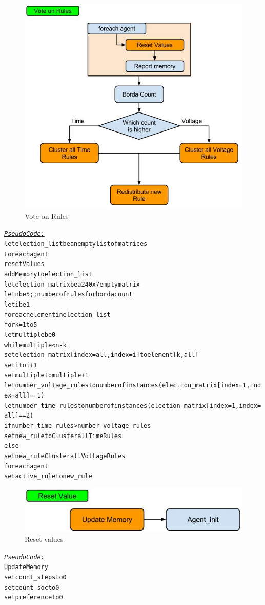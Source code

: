 \documentclass[a4paper]{article}
\begin{document}
\begin{figure}[!ht]
\includegraphics[width =\textwidth]{vote_rules.jpg}
\caption{Vote on Rules}
\label{vote_rules}
\end{figure}
\begin{alltt}
 \underline{\textit{Pseudo Code:}}
let election_list be an empty list of matrices
Foreach agent
    reset Values 
    add Memory to election_list
let election_matrix be a 240x7 empty  matrix
let n be 5  ;; number of rules for borda count
let i be 1 
foreach element in election_list 
    for k = 1 to 5
        let multiple be 0
        while multiple < n-k 
            set election_matrix[index = all, index = i] to element[k, all]
set i to i + 1 
set multiple to multiple + 1 
let number_voltage_rules to number of instances (election_matrix[index = 1, index = all]== 1)
let number_time_rules to number of instances (election_matrix[index = 1, index = all]== 2)
if number_time_rules > number_voltage_rules 
    set new_rule to Cluster all Time Rules
else 
    set new_rule Cluster all Voltage Rules
foreach agent
    set active_rule to new_rule
\end{alltt}

\begin{figure}[!ht]
\includegraphics[width =\textwidth]{reset_value.jpg}
\caption{Reset values}
\label{reset_values}
\end{figure}
\begin{alltt}
 \underline{\textit{Pseudo Code:}}
Update Memory 
set count_steps to 0
set count_soc to 0 
set preference to 0 
\end{alltt}
\end{document}
